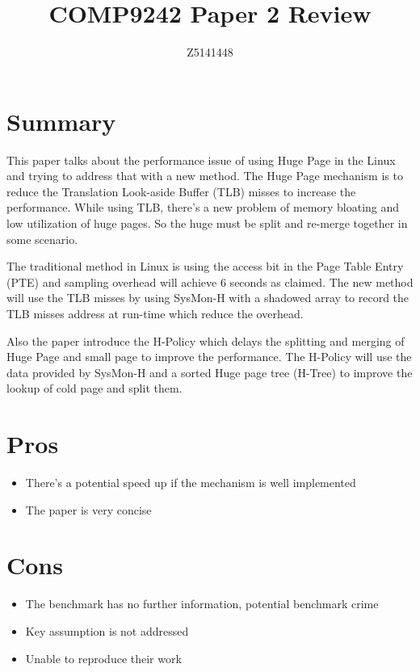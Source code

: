 \documentclass{article}
\begin{document}
\title{COMP9242 Paper 2 Review}
\author{Z5141448}

\maketitle

\section{Summary}

This paper talks about the performance issue of using Huge Page in the Linux and trying to address that with a new method. The Huge Page mechanism is to reduce the Translation Look-aside Buffer (TLB) misses to increase the performance. While using TLB, there's a new problem of memory bloating and low utilization of huge pages. So the huge must be split and re-merge together in some scenario. 

The traditional method in Linux is using the access bit in the Page Table Entry (PTE) and sampling overhead will achieve 6 seconds as claimed. The new method will use the TLB misses by using SysMon-H with a shadowed array to record the TLB misses address at run-time which reduce the overhead. 

Also the paper introduce the H-Policy which delays the splitting and merging of Huge Page and small page to improve the performance. The H-Policy will use the data provided by SysMon-H and a sorted Huge page tree (H-Tree) to improve the lookup of cold page and split them. 

\section{Pros}

\begin{itemize}
    \item There's a potential speed up if the mechanism is well implemented
    \item The paper is very concise 
\end{itemize}

\section{Cons}

\begin{itemize}
    \item The benchmark has no further information, potential benchmark crime
    \item Key assumption is not addressed
    \item Unable to reproduce their work
\end{itemize}
\end{document}
